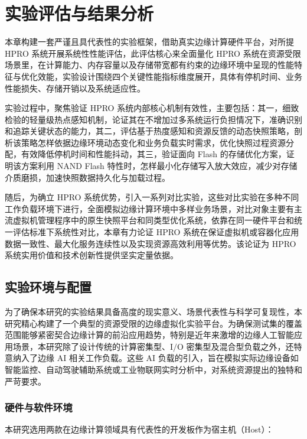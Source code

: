 
\chapter{实验评估与结果分析}
\label{ch:eval}

本章构建一套严谨且具代表性的实验框架，借助真实边缘计算硬件平台，对所提 HPRO 系统开展系统性性能评估，此评估核心来全面量化 HPRO 系统在资源受限场景里，在计算能力、内存容量以及存储带宽都有约束的边缘环境中呈现的性能特征与优化效能，实验设计围绕四个关键性能指标维度展开，具体有停机时间、业务性能损失、存储开销以及系统适应性。

实验过程中，聚焦验证 HPRO 系统内部核心机制有效性，主要包括：其一，细致检验的轻量级热点感知机制，论证其在不增加过多系统运行负担情况下，准确识别和追踪关键状态的能力，其二，评估基于热度感知和资源反馈的动态快照策略，剖析该策略怎样依据边缘环境动态变化和业务负载实时需求，优化快照过程资源分配，有效降低停机时间和性能抖动，其三，验证面向 Flash 的存储优化方案，证明该方案利用 NAND Flash 特性时，怎样最小化存储写入放大效应，减少对存储介质磨损，加速快照数据持久化与加载过程。

随后，为确立 HPRO 系统优势，引入一系列对比实验，这些对比实验在多种不同工作负载环境下进行，全面模拟边缘计算环境中多样业务场景，对比对象主要有主流虚拟机管理程序中的原生快照平台和同类型优化系统，依靠在同一硬件平台和统一评估标准下系统性对比，本章有力论证 HPRO 系统在保证虚拟机或容器化应用数据一致性、最大化服务连续性以及实现资源高效利用等优势。该论证为 HPRO 系统实用价值和技术创新性提供坚实定量依据。

\section{实验环境与配置}

为了确保本研究的实验结果具备高度的现实意义、场景代表性与科学可复现性，本研究精心构建了一个典型的资源受限的边缘虚拟化实验平台。为确保测试集的覆盖范围能够紧密契合边缘计算的前沿应用趋势，特别是近年来激增的边缘人工智能应用场景，本研究除了设计传统的计算密集型、$\text{I/O}$ 密集型及混合型负载之外，还特意纳入了边缘 $\text{AI}$ 相关工作负载。这些 $\text{AI}$ 负载的引入，旨在模拟实际边缘设备如智能监控、自动驾驶辅助系统或工业物联网实时分析中，对系统资源提出的独特和严苛要求。

\subsection{硬件与软件环境}

本研究选用两款在边缘计算领域具有代表性的开发板作为宿主机（Host）：

